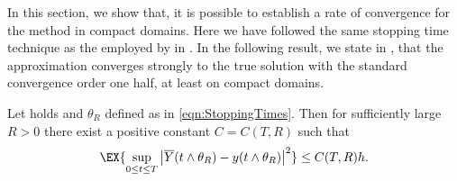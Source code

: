 
	In this section, we show that, it is possible to establish a rate of convergence for the \SM
method in compact domains. Here we have followed  the same stopping time technique as the employed by 
\citeauthor{Mao2013} in \cite[Lem. 4.3]{Mao2013}.
In the following result, we state in , that  the \SM approximation converges strongly 
to the true solution with the standard convergence order one half, at least on compact domains.

\begin{thm}\label{thm:StrongConvergenceOrder}
	Let  holds and $\theta_R$ defined as in \eqref{eqn:StoppingTimes}. Then for sufficiently large $R>0$ 
	there exist a positive constant $C=C(T,R)$ such that
	\begin{equation*}
	\EX{
			\sup_{0 \leq t \leq T}
				\left|
					\overline{Y}(t\wedge \theta_R)
						-y(t\wedge \theta_R)
				\right|^2
		}
		\leq
		C(T,R)h .
	\end{equation*}
	\end{thm}
%
